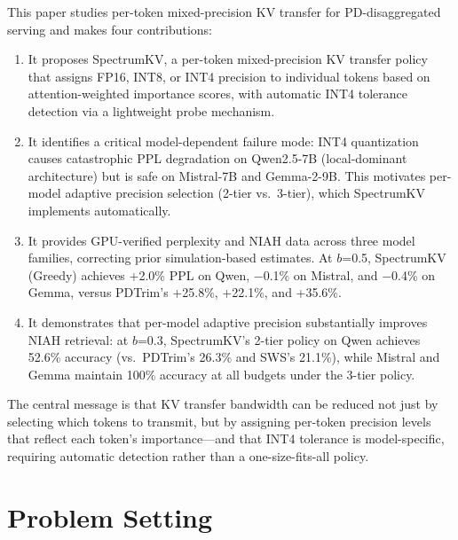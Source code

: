 \documentclass[11pt]{article}
\newcommand{\method}{SpectrumKV}
\newcommand{\fullmethod}{SpectrumKV}
\newcommand{\pct}{\%}
\theoremstyle{definition}
\theoremstyle{plain}
\begin{document}
This paper studies per-token mixed-precision KV transfer for PD-disaggregated serving and makes four contributions:
\begin{enumerate}[leftmargin=1.5em,itemsep=2pt]
  \item It proposes \fullmethod{}, a per-token mixed-precision KV transfer policy that assigns FP16, INT8, or INT4 precision to individual tokens based on attention-weighted importance scores, with automatic INT4 tolerance detection via a lightweight probe mechanism.
  \item It identifies a critical model-dependent failure mode: INT4 quantization causes catastrophic PPL degradation on Qwen2.5-7B (local-dominant architecture) but is safe on Mistral-7B and Gemma-2-9B.  This motivates per-model adaptive precision selection (2-tier vs.\ 3-tier), which \method{} implements automatically.
  \item It provides GPU-verified perplexity and NIAH data across three model families, correcting prior simulation-based estimates.  At $b$=0.5, \method{} (Greedy) achieves +2.0\pct{} PPL on Qwen, $-$0.1\pct{} on Mistral, and $-$0.4\pct{} on Gemma, versus PDTrim's +25.8\pct{}, +22.1\pct{}, and +35.6\pct{}.
  \item It demonstrates that per-model adaptive precision substantially improves NIAH retrieval: at $b$=0.3, \method{}'s 2-tier policy on Qwen achieves 52.6\pct{} accuracy (vs.\ PDTrim's 26.3\pct{} and SWS's 21.1\pct{}), while Mistral and Gemma maintain 100\pct{} accuracy at all budgets under the 3-tier policy.
\end{enumerate}

The central message is that KV transfer bandwidth can be reduced not just by selecting which tokens to transmit, but by assigning per-token precision levels that reflect each token's importance---and that INT4 tolerance is model-specific, requiring automatic detection rather than a one-size-fits-all policy.

\section{Problem Setting}
\label{sec:problem}
\end{document}
